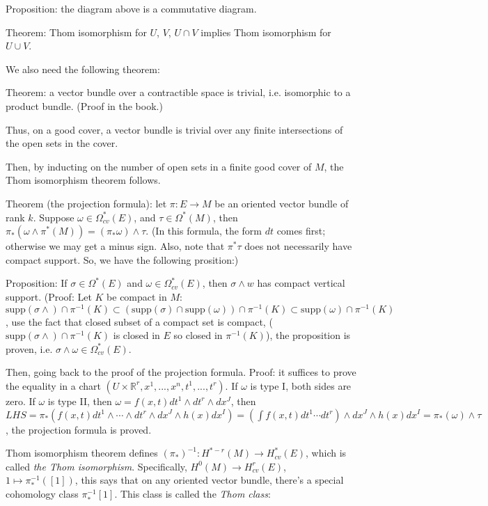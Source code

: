 \documentclass{article}
\theoremstyle{mystyle}
\theoremstyle{remark}
\numberwithin{equation}{section}
\begin{document}
Proposition: the diagram above is a commutative diagram.

Theorem: Thom isomorphism for $U$, $V$, $U\cap V$ implies Thom isomorphism for $U\cup V$.

We also need the following theorem:

Theorem: a vector bundle over a contractible space is trivial, i.e. isomorphic to a product bundle. (Proof in the book.)

Thus, on a good cover, a vector bundle is trivial over any finite intersections of the open sets in the cover. 

Then, by inducting on the number of open sets in a finite good cover of $M$, the Thom isomorphism theorem follows.


Theorem (the projection formula): let $\pi\colon E\rightarrow M$ be an oriented vector bundle of rank $k$. Suppose $\omega \in \Omega^*_{cv}(E)$, and $\tau \in \Omega^*(M)$, then $\pi_*(\omega\wedge \pi^*(M)) = (\pi_*\omega)\wedge \tau$. (In this formula, the form $dt$ comes first; otherwise we may get a minus sign. Also, note that $\pi^*\tau$ does not necessarily have compact support. So, we have the following prosition:)

Proposition: If $\sigma \in \Omega^*(E)$ and $\omega \in \Omega^*_{cv}(E)$, then $\sigma \wedge w$ has compact vertical support. (Proof: Let $K$ be compact in $M$: $\text{supp}(\sigma \wedge)\cap \pi^{-1}(K) \subset (\text{supp}(\sigma)\cap \text{supp}(\omega)) \cap \pi^{-1}(K)\subset \text{supp}(\omega)\cap \pi^{-1}(K)$, use the fact that closed subset of a compact set is compact, ($\text{supp}(\sigma \wedge)\cap \pi^{-1}(K)$ is closed in $E$ so closed in $\pi^{-1}(K)$), the proposition is proven, i.e. $\sigma\wedge \omega \in \Omega^*_{cv}(E)$. 

Then, going back to the proof of the projection formula. Proof: it suffices to prove the equality in a chart $(U\times \mathbb{R}^r,x^1,...,x^n,t^1,...,t^r)$. If $\omega$ is type I, both sides are zero. If $\omega$ is type II, then $\omega = f(x,t)dt^1\wedge dt^r\wedge dx^J$, then $LHS = \pi_*(f(x,t)dt^1\wedge \cdots \wedge dt^r \wedge d x^J\wedge h(x)d x^I)
= \left(\int f(x,t)dt^1\cdots dt^r\right)\wedge d x^J\wedge h(x)dx^I = \pi_*(\omega) \wedge \tau$, the projection formula is proved.

Thom isomorphism theorem defines $(\pi_*)^{-1}\colon H^{*-r}(M)\rightarrow H^*_{cv}(E)$, which is called \emph{the Thom isomorphism}. Specifically, $H^0(M)\rightarrow H^r_{cv}(E)$, $1\mapsto \pi_*^{-1}([1])$, this says that on any oriented vector bundle, there's a special cohomology class $\pi_*^{-1}[1]$. This class is called the \emph{Thom class}:
\end{document}
